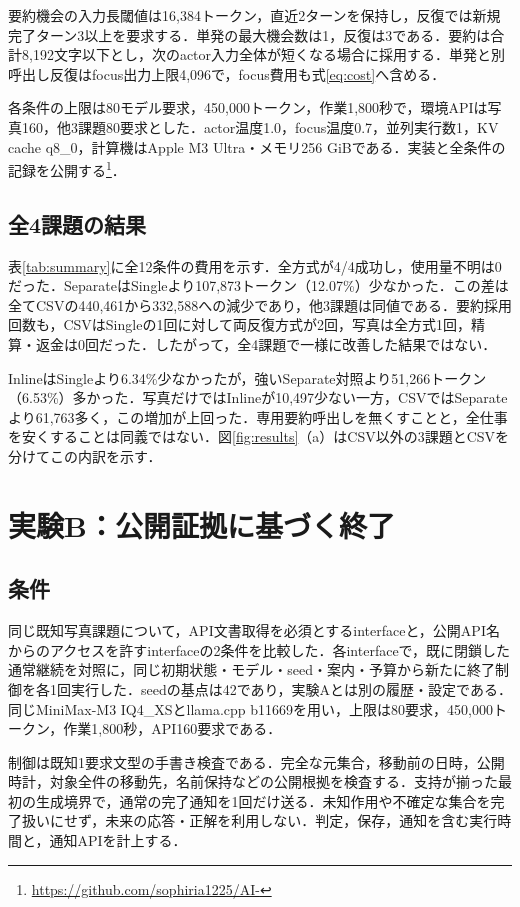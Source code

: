\documentclass[letter]{ieicej}
\begin{document}
要約機会の入力長閾値は16,384トークン，直近2ターンを保持し，反復では新規完了ターン3以上を要求する．単発の最大機会数は1，反復は3である．要約は合計8,192文字以下とし，次のactor入力全体が短くなる場合に採用する．単発と別呼出し反復はfocus出力上限4,096で，focus費用も式\eqref{eq:cost}へ含める．

各条件の上限は80モデル要求，450,000トークン，作業1,800秒で，環境APIは写真160，他3課題80要求とした．actor温度1.0，focus温度0.7，並列実行数1，KV cache q8\_0，計算機はApple M3 Ultra・メモリ256 GiBである．実装と全条件の記録を公開する\footnote{\url{https://github.com/sophiria1225/AI-}}．

\subsection{全4課題の結果}
表\ref{tab:summary}に全12条件の費用を示す．全方式が4/4成功し，使用量不明は0だった．SeparateはSingleより107,873トークン（12.07\%）少なかった．この差は全てCSVの440,461から332,588への減少であり，他3課題は同値である．要約採用回数も，CSVはSingleの1回に対して両反復方式が2回，写真は全方式1回，精算・返金は0回だった．したがって，全4課題で一様に改善した結果ではない．

InlineはSingleより6.34\%少なかったが，強いSeparate対照より51,266トークン（6.53\%）多かった．写真だけではInlineが10,497少ない一方，CSVではSeparateより61,763多く，この増加が上回った．専用要約呼出しを無くすことと，全仕事を安くすることは同義ではない．図\ref{fig:results}（a）はCSV以外の3課題とCSVを分けてこの内訳を示す．



\section{実験B：公開証拠に基づく終了}
\subsection{条件}
同じ既知写真課題について，API文書取得を必須とするinterfaceと，公開API名からのアクセスを許すinterfaceの2条件を比較した．各interfaceで，既に閉鎖した通常継続を対照に，同じ初期状態・モデル・seed・案内・予算から新たに終了制御を各1回実行した．seedの基点は42であり，実験Aとは別の履歴・設定である．同じMiniMax-M3 IQ4\_XSとllama.cpp b11669を用い，上限は80要求，450,000トークン，作業1,800秒，API160要求である．

制御は既知1要求文型の手書き検査である．完全な元集合，移動前の日時，公開時計，対象全件の移動先，名前保持などの公開根拠を検査する．支持が揃った最初の生成境界で，通常の完了通知を1回だけ送る．未知作用や不確定な集合を完了扱いにせず，未来の応答・正解を利用しない．判定，保存，通知を含む実行時間と，通知APIを計上する．
\end{document}
